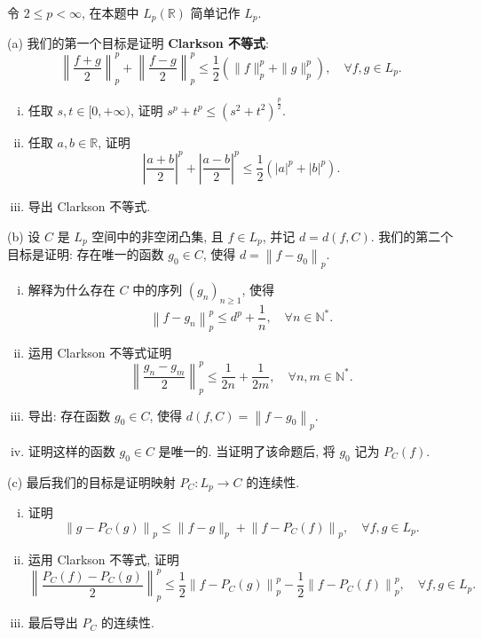 \begin{exercise}
    令 $2 \leq p<\infty$, 在本题中 $L_{p}(\mathbb{R})$ 简单记作 $L_{p}$.

    (a) 我们的第一个目标是证明 \textbf{Clarkson 不等式}:
    \[
    \left\|\frac{f+g}{2}\right\|_{p}^{p}+\left\|\frac{f-g}{2}\right\|_{p}^{p} \leq \frac{1}{2}\left(\|f\|_{p}^{p}+\|g\|_{p}^{p}\right), \quad \forall f, g \in L_{p}.
    \]
    \begin{enumerate}[(i)]
        \item 任取 $s, t \in[0,+\infty)$, 证明 $s^{p}+t^{p} \leq\left(s^{2}+t^{2}\right)^{\frac{p}{2}}$.
        \item 任取 $a, b \in \mathbb{R}$, 证明
        \[
        \left|\frac{a+b}{2}\right|^{p}+\left|\frac{a-b}{2}\right|^{p} \leq \frac{1}{2}\left(|a|^{p}+|b|^{p}\right).
        \]
        \item 导出 Clarkson 不等式.
    \end{enumerate}

    (b) 设 $C$ 是 $L_{p}$ 空间中的非空闭凸集, 
    且 $f \in L_{p}$, 并记 $d=d(f, C)$. 我们的第二个目标是证明: 
    存在唯一的函数 $g_{0} \in C$, 使得 $d=\left\|f-g_{0}\right\|_{p}$.
    \begin{enumerate}[(i)]
        \item 解释为什么存在 $C$ 中的序列 $\left(g_{n}\right)_{n \geq 1}$, 使得
        \[
        \left\|f-g_{n}\right\|_{p}^{p} \leq d^{p}+\frac{1}{n}, \quad \forall n \in \mathbb{N}^{*}.
        \]
        \item 运用 Clarkson 不等式证明
        \[
        \left\|\frac{g_{n}-g_{m}}{2}\right\|_{p}^{p} \leq \frac{1}{2n}+\frac{1}{2m}, \quad \forall n, m \in \mathbb{N}^{*}.
        \]
        \item 导出: 存在函数 $g_{0} \in C$, 使得 $d(f, C)=\left\|f-g_{0}\right\|_{p}$.
        \item 证明这样的函数 $g_{0} \in C$ 是唯一的. 当证明了该命题后, 将 $g_{0}$ 记为 $P_{C}(f)$.
    \end{enumerate}

    (c) 最后我们的目标是证明映射 $P_{C}: L_{p} \rightarrow C$ 的连续性.
    \begin{enumerate}[(i)]
        \item 证明
        \[
        \left\|g-P_{C}(g)\right\|_{p} \leq\|f-g\|_{p}+\left\|f-P_{C}(f)\right\|_{p}, \quad \forall f, g \in L_{p}.
        \]
        \item 运用 Clarkson 不等式, 证明
        \[
        \left\|\frac{P_{C}(f)-P_{C}(g)}{2}\right\|_{p}^{p} \leq \frac{1}{2}\left\|f-P_{C}(g)\right\|_{p}^{p}-\frac{1}{2}\left\|f-P_{C}(f)\right\|_{p}^{p}, \quad \forall f, g \in L_{p}.
        \]
        \item 最后导出 $P_{C}$ 的连续性.
    \end{enumerate}
\end{exercise}

